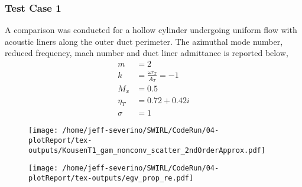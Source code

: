 \subsubsection{Test Case 1}
A comparison was conducted for a hollow cylinder undergoing uniform flow with
acoustic liners along the outer duct perimeter. The azimuthal mode number, reduced 
frequency, mach number and duct liner admittance is reported below,
\begin{align*}
    m &= 2 \\
    k &= \frac{\omega r_T}{A_T} = -1 \\
    M_x &= 0.5 \\
    \eta_T &= 0.72 + 0.42i\\
    \sigma &= 1
\end{align*} 



\begin{figure}[h!]
    \centering
    \texttt{[image: /home/jeff-severino/SWIRL/CodeRun/04-plotReport/tex-outputs/KousenT1\_gam\_nonconv\_scatter\_2ndOrderApprox.pdf]}
\end{figure}







\begin{figure}[h!]
    \centering
    \texttt{[image: /home/jeff-severino/SWIRL/CodeRun/04-plotReport/tex-outputs/egv\_prop\_re.pdf]}
    \label{fig:prop_re}
\end{figure}

